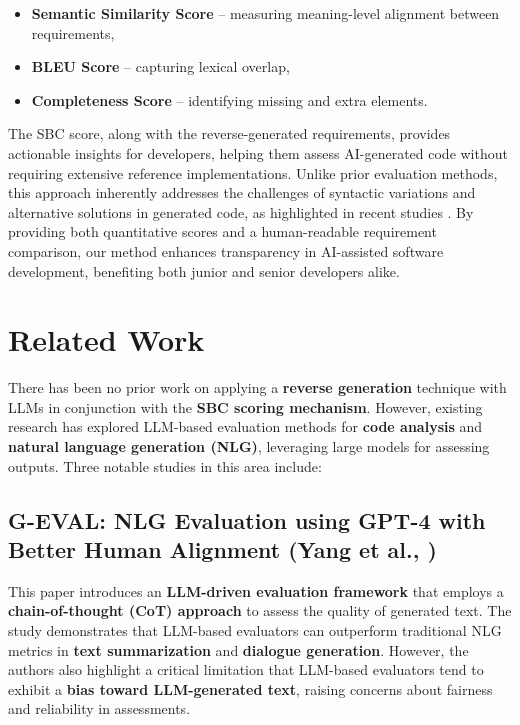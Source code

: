 \documentclass{article}
\begin{document}
\begin{itemize}
    \item \textbf{Semantic Similarity Score} – measuring meaning-level alignment between requirements,  
    \item \textbf{BLEU Score} – capturing lexical overlap,  
    \item \textbf{Completeness Score} – identifying missing and extra elements.  
\end{itemize}  

The SBC score, along with the reverse-generated requirements, provides actionable insights for developers, helping them assess AI-generated code without requiring extensive reference implementations. Unlike prior evaluation methods, this approach inherently addresses the challenges of syntactic variations and alternative solutions in generated code, as highlighted in recent studies \cite{tong2024syntactic}. By providing both quantitative scores and a human-readable requirement comparison, our method enhances transparency in AI-assisted software development, benefiting both junior and senior developers alike.  


\section{Related Work}

There has been no prior work on applying a \textbf{reverse generation} technique with LLMs in conjunction with the \textbf{SBC scoring mechanism}. However, existing research has explored LLM-based evaluation methods for \textbf{code analysis} and \textbf{natural language generation (NLG)}, leveraging large models for assessing outputs. Three notable studies in this area include:

\subsection{G-EVAL: NLG Evaluation using GPT-4 with Better Human Alignment (Yang et al., \cite{yang2023geval})}

This paper introduces an \textbf{LLM-driven evaluation framework} that employs a \textbf{chain-of-thought (CoT) approach} to assess the quality of generated text. The study demonstrates that LLM-based evaluators can outperform traditional NLG metrics in \textbf{text summarization} and \textbf{dialogue generation}. However, the authors also highlight a critical limitation that LLM-based evaluators tend to exhibit a \textbf{bias toward LLM-generated text}, raising concerns about fairness and reliability in assessments.
\end{document}

